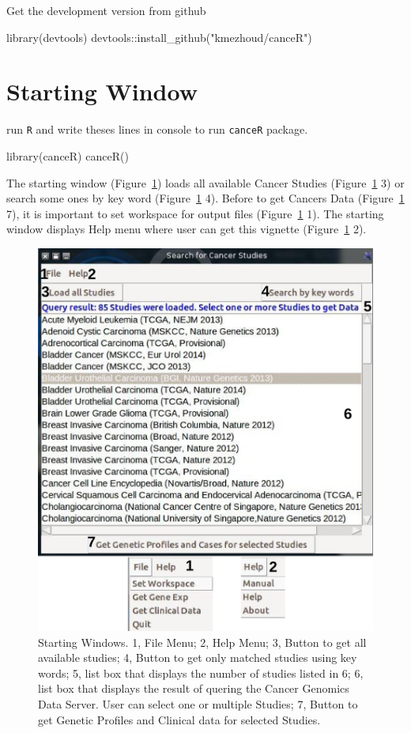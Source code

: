 \documentclass[a4paper]{article}
\begin{document}
Get the development version from github
\begin{Schunk}
\begin{Sinput}
library(devtools)
devtools::install_github("kmezhoud/canceR")
\end{Sinput}
\end{Schunk}


\section{Starting Window}
run \texttt{R} and write theses lines in console to run \texttt{canceR} package.
\begin{Schunk}
\begin{Sinput}
library(canceR)
canceR()
\end{Sinput}
\end{Schunk}
The starting window (Figure~\ref{Fig1}) loads all available Cancer Studies (Figure~\ref{Fig1} 3) or search some ones by key word (Figure~\ref{Fig1} 4). Before to get Cancers Data (Figure~\ref{Fig1} 7), it is important to set workspace  for output files (Figure~\ref{Fig1} 1). The starting window displays Help menu where user can get this vignette (Figure~\ref{Fig1} 2).

\begin{figure}[!ht]
 \centering
\includegraphics[scale=0.5]{image/starting.png}
\caption{Starting Windows. 1, File Menu; 2, Help Menu; 3, Button to get all available studies; 4, Button to get only matched studies using key words; 5, list box that displays the number of studies listed in 6; 6, list box that displays the result of quering the Cancer Genomics Data Server. User can select one or multiple Studies; 7, Button to get Genetic Profiles and Clinical data for selected Studies.}
\label{Fig1}
\end{figure}
\end{document}
